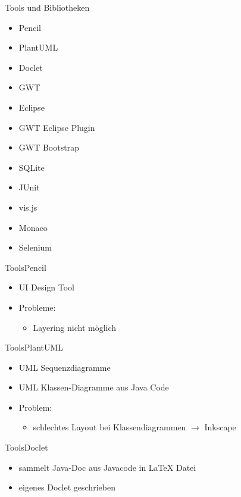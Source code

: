 \documentclass[10pt]{beamer}
\begin{document}
\begin{frame}{Tools und Bibliotheken}{}
	\begin{itemize}
		\item Pencil
		\item PlantUML
		\item Doclet
		\item GWT
		\item Eclipse
		\item GWT Eclipse Plugin
		\item GWT Bootstrap
		\item SQLite
		\item JUnit
		\item vis.js
		\item Monaco
		\item Selenium
	\end{itemize}
\end{frame}

\begin{frame}{Tools}{Pencil}
	\begin{itemize}
		\item UI Design Tool
		\item Probleme:
			\begin{itemize}
				\item Layering nicht möglich
			\end{itemize} 
	\end{itemize}
\end{frame}

\begin{frame}{Tools}{PlantUML}
	\begin{itemize}
		\item UML Sequenzdiagramme
		\item UML Klassen-Diagramme aus Java Code
		\item Problem: 
			\begin{itemize}
				\item schlechtes Layout bei Klassendiagrammen $\rightarrow$ Inkscape
			\end{itemize}
	\end{itemize}
\end{frame}

\begin{frame}{Tools}{Doclet}
	\begin{itemize}
		\item sammelt Java-Doc aus Javacode in LaTeX Datei
		\item eigenes Doclet geschrieben
	\end{itemize}
\end{frame}
\end{document}
